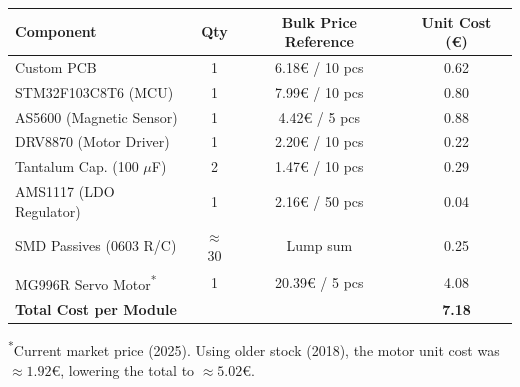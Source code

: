 \begin{table}[htbp]
    \centering
    \begin{tabular}{lccc}
        \toprule
        \textbf{Component}  & \textbf{Qty} & \textbf{Bulk Price Reference} & \textbf{Unit Cost (€)} \\
        \midrule
        Custom PCB                              & 1             & 6.18€ / 10 pcs    & 0.62 \\
        STM32F103C8T6 (MCU)                     & 1             & 7.99€ / 10 pcs    & 0.80 \\
        AS5600 (Magnetic Sensor)                & 1             & 4.42€ / 5 pcs     & 0.88 \\
        DRV8870 (Motor Driver)                  & 1             & 2.20€ / 10 pcs    & 0.22 \\
        Tantalum Cap. (100 $\mu$F)              & 2             & 1.47€ / 10 pcs    & 0.29 \\
        AMS1117 (LDO Regulator)                 & 1             & 2.16€ / 50 pcs    & 0.04 \\
        SMD Passives (0603 R/C)                 & $\approx$30   & Lump sum          & 0.25 \\
        MG996R Servo Motor\textsuperscript{*}   & 1             & 20.39€ / 5 pcs    & 4.08 \\
        \midrule
        \textbf{Total Cost per Module} & & & \textbf{7.18} \\
        \bottomrule
    \end{tabular}
    \vspace{1ex}

    {\footnotesize \textsuperscript{*}Current market price (2025). Using older stock (2018), the motor unit cost was
    $\approx 1.92$€, lowering the total to $\approx 5.02$€.}
\end{table}
